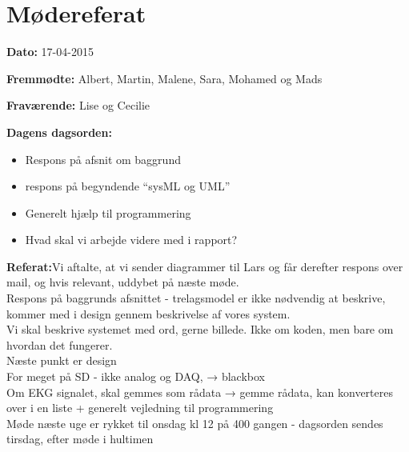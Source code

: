 \chapter{Mødereferat}

\textbf{Dato:} 17-04-2015

\textbf{Fremmødte:} Albert, Martin, Malene, Sara, Mohamed og Mads

\textbf{Fraværende:} Lise og Cecilie

\textbf{Dagens dagsorden:}
\begin{itemize}
	\item Respons på afsnit om baggrund
	\item respons på begyndende “sysML og UML”
	\item Generelt hjælp til programmering
	\item Hvad skal vi arbejde videre med i rapport?
\end{itemize}

\textbf{Referat:}Vi aftalte, at vi sender diagrammer til Lars og får derefter respons over mail, og hvis relevant, uddybet på næste møde. \\
	Respons på baggrunds afsnittet - trelagsmodel er ikke nødvendig at beskrive, kommer med i design gennem beskrivelse af vores system. \\
	Vi skal beskrive systemet med ord, gerne billede. Ikke om koden, men bare om hvordan det fungerer.\\
	Næste punkt er design \\
	For meget på SD - ikke analog og DAQ,  → blackbox\\
	Om EKG signalet, skal gemmes som rådata → gemme rådata, kan konverteres over i en liste + generelt vejledning til programmering \\
	Møde næste uge er rykket til onsdag kl 12 på 400 gangen - dagsorden sendes tirsdag, efter 	møde i hultimen
